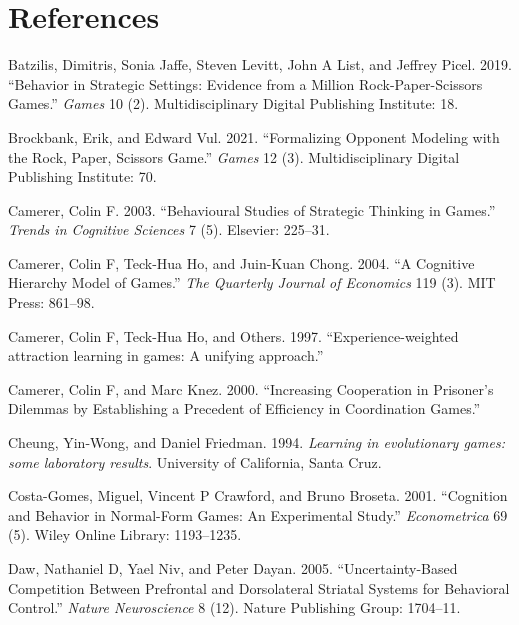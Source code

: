 \documentclass[smallextended]{svjour3}       %
\begin{document}
\hypertarget{references}{%
\section*{References}\label{references}}

\hypertarget{refs}{}
\leavevmode\hypertarget{ref-batzilis2019behavior}{}%
Batzilis, Dimitris, Sonia Jaffe, Steven Levitt, John A List, and Jeffrey
Picel. 2019. ``Behavior in Strategic Settings: Evidence from a Million
Rock-Paper-Scissors Games.'' \emph{Games} 10 (2). Multidisciplinary
Digital Publishing Institute: 18.

\leavevmode\hypertarget{ref-brockbank2021formalizing}{}%
Brockbank, Erik, and Edward Vul. 2021. ``Formalizing Opponent Modeling
with the Rock, Paper, Scissors Game.'' \emph{Games} 12 (3).
Multidisciplinary Digital Publishing Institute: 70.

\leavevmode\hypertarget{ref-camerer2003behavioural}{}%
Camerer, Colin F. 2003. ``Behavioural Studies of Strategic Thinking in
Games.'' \emph{Trends in Cognitive Sciences} 7 (5). Elsevier: 225--31.

\leavevmode\hypertarget{ref-camerer2004cognitive}{}%
Camerer, Colin F, Teck-Hua Ho, and Juin-Kuan Chong. 2004. ``A Cognitive
Hierarchy Model of Games.'' \emph{The Quarterly Journal of Economics}
119 (3). MIT Press: 861--98.

\leavevmode\hypertarget{ref-camerer1997experience}{}%
Camerer, Colin F, Teck-Hua Ho, and Others. 1997. ``Experience-weighted
attraction learning in games: A unifying approach.''

\leavevmode\hypertarget{ref-knez2000}{}%
Camerer, Colin F, and Marc Knez. 2000. ``Increasing Cooperation in
Prisoner's Dilemmas by Establishing a Precedent of Efficiency in
Coordination Games.''

\leavevmode\hypertarget{ref-cheung1994learning}{}%
Cheung, Yin-Wong, and Daniel Friedman. 1994. \emph{Learning in
evolutionary games: some laboratory results}. University of California,
Santa Cruz.

\leavevmode\hypertarget{ref-costa2001cognition}{}%
Costa-Gomes, Miguel, Vincent P Crawford, and Bruno Broseta. 2001.
``Cognition and Behavior in Normal-Form Games: An Experimental Study.''
\emph{Econometrica} 69 (5). Wiley Online Library: 1193--1235.

\leavevmode\hypertarget{ref-daw2005uncertainty}{}%
Daw, Nathaniel D, Yael Niv, and Peter Dayan. 2005. ``Uncertainty-Based
Competition Between Prefrontal and Dorsolateral Striatal Systems for
Behavioral Control.'' \emph{Nature Neuroscience} 8 (12). Nature
Publishing Group: 1704--11.
\end{document}
